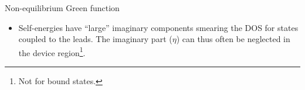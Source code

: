 \begin{frame}
\begin{block}{Non-equilibrium Green function}
\begin{itemize}
    \item<4-> Self-energies have ``large'' imaginary components smearing the DOS for states
    coupled to the leads. The imaginary part ($\eta$) can thus often be neglected in the
    device region\footnote<4->{Not for bound states.}.
    
    \end{itemize}

  \end{block}

  
\end{frame}

